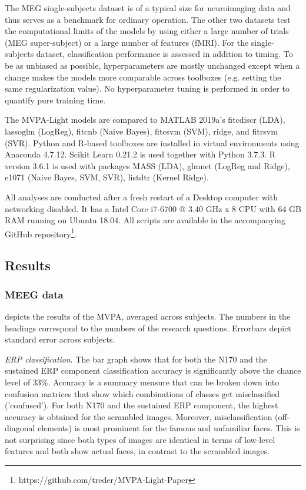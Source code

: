 \documentclass[utf8]{frontiersSCNS} %
\begin{document}
The MEG single-subjects dataset is of a typical size for neuroimaging data and thus serves as a benchmark for ordinary operation. The other two datasets test the computational limits of the models by using either a large number of trials (MEG super-subject) or a large number of features (fMRI). For the single-subjects dataset, classification performance is assessed in addition to timing.
To be as unbiased as possible, hyperparameters are mostly unchanged except when a change makes the models more comparable across toolboxes (e.g. setting the same regularization value). No hyperparameter tuning is performed in order to quantify pure training time.

The MVPA-Light models are compared to MATLAB 2019a's fitcdiscr (LDA), lassoglm (LogReg), fitcnb (Naive Bayes), fitcsvm (SVM), ridge, and fitrsvm (SVR). Python and R-based toolboxes are installed in virtual environments using Anaconda 4.7.12. Scikit Learn 0.21.2 is used together with Python 3.7.3. R version 3.6.1 is used with packages MASS (LDA), glmnet (LogReg and Ridge), e1071 (Naive Bayes, SVM, SVR), listdtr (Kernel Ridge).

All analyses are conducted after a fresh restart of a Desktop computer with networking disabled. It has a Intel Core i7-6700 @ 3.40 GHz x 8 CPU with 64 GB RAM running on Ubuntu 18.04. All scripts are available in the accompanying GitHub repository\footnote{https://github.com/treder/MVPA-Light-Paper}. 

\subsection{Results}

\subsubsection{MEEG data}
 depicts the results of the MVPA, averaged across subjects. The numbers in the headings correspond to the numbers of the research questions. Errorbars depict standard error across subjects.

\textit{ERP classification}. The bar graph shows that for both the N170 and the sustained ERP component classification accuracy is significantly above the chance level of 33\%. Accuracy is a summary measure that can be broken down into confusion matrices that show which combinations of classes get misclassified ('confused'). For both N170 and the sustained ERP component, the highest accuracy is obtained for the scrambled images. Moreover,  misclassification (off-diagonal elements) is most prominent for the famous and unfamiliar faces. This is not surprising since both types of images are identical in terms of low-level features and both show actual faces, in contrast to the scrambled images. 
\end{document}
